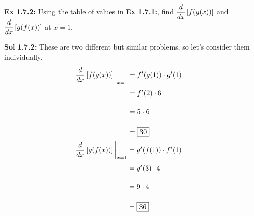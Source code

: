 \begin{tcolorbox}[example]
    \textbf{Ex 1.7.2: } Using the table of values in \textbf{Ex 1.7.1:}, find $\dfrac{d}{dx} \left[f(g(x))\right]$ and $\dfrac{d}{dx} \left[g(f(x))\right]$ at $x = 1$. 
\end{tcolorbox}
\begin{tcolorbox}[solution]
    \textbf{Sol 1.7.2: } These are two different but similar problems, so let's consider them individually. \begin{align*}
        & \dfrac{d}{dx} \left[f(g(x))\right] \bigg|_{x = 1} \begin{aligned}[t]
            & = f'(g(1)) \cdot g'(1) \\[11pt]
            & = f'(2) \cdot 6 \\[11pt]
            & = 5 \cdot 6 \\[11pt]
            & = \boxed{30}
        \end{aligned}
    \end{align*} \begin{align*}
        & \dfrac{d}{dx} \left[g(f(x))\right] \bigg|_{x = 1} \begin{aligned}[t]
            & = g'(f(1)) \cdot f'(1) \\[11pt]
            & = g'(3) \cdot 4 \\[11pt]
            & = 9 \cdot 4 \\[11pt]
            & = \boxed{36}
        \end{aligned}
    \end{align*}
\end{tcolorbox} \vspace{11pt}

